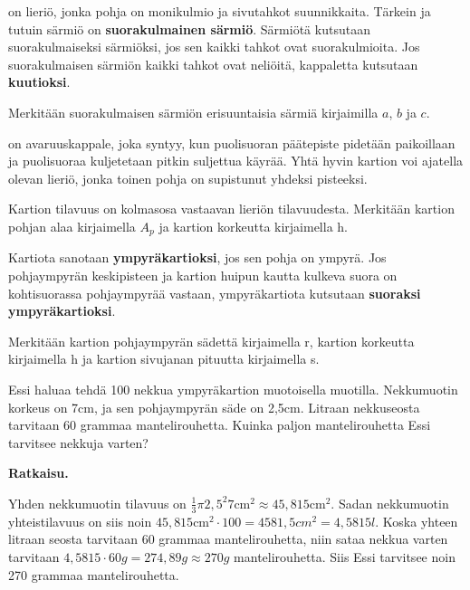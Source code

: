  on lieriö, jonka pohja on monikulmio ja sivutahkot suunnikkaita.
Tärkein ja tutuin särmiö on \textbf{suorakulmainen särmiö}.
Särmiötä kutsutaan suorakulmaiseksi särmiöksi, jos sen kaikki tahkot ovat suorakulmioita. Jos suorakulmaisen särmiön kaikki tahkot ovat neliöitä, kappaletta kutsutaan \textbf{kuutioksi}.

Merkitään suorakulmaisen särmiön erisuuntaisia särmiä kirjaimilla $a$, $b$ ja $c$. 



 on avaruuskappale, joka syntyy, kun puolisuoran päätepiste pidetään paikoillaan ja puolisuoraa kuljetetaan pitkin suljettua käyrää. Yhtä hyvin kartion voi ajatella olevan lieriö, jonka toinen pohja on supistunut yhdeksi pisteeksi.

Kartion tilavuus on kolmasosa vastaavan lieriön tilavuudesta. Merkitään kartion pohjan alaa kirjaimella $A_p$ ja kartion korkeutta kirjaimella h.


Kartiota sanotaan \textbf{ympyräkartioksi}, jos sen pohja on ympyrä. Jos pohjaympyrän keskipisteen ja kartion huipun kautta kulkeva suora on kohtisuorassa pohjaympyrää vastaan, ympyräkartiota kutsutaan \textbf{suoraksi ympyräkartioksi}.

Merkitään kartion pohjaympyrän sädettä kirjaimella r, kartion korkeutta kirjaimella h ja kartion sivujanan pituutta kirjaimella s.



\begin{esimerkki}
Essi haluaa tehdä 100 nekkua ympyräkartion muotoisella muotilla. Nekkumuotin korkeus on 7cm, ja sen pohjaympyrän säde on 2,5cm. Litraan nekkuseosta tarvitaan 60 grammaa mantelirouhetta. Kuinka paljon mantelirouhetta Essi tarvitsee nekkuja varten?

\textbf{Ratkaisu.}

Yhden nekkumuotin tilavuus on $\frac{1}{3} \pi 2,5^2 7 \text{cm}^2 \approx 45,815\text{cm}^2.$ Sadan nekkumuotin yhteistilavuus on siis noin $45,815\text{cm}^2 \cdot 100 = 4581,5 {cm}^2=4,5815 l$. Koska yhteen litraan seosta tarvitaan 60 grammaa mantelirouhetta, niin sataa nekkua varten tarvitaan $4,5815 \cdot 60 g = 274,89g \approx 270 g$ mantelirouhetta. Siis Essi tarvitsee noin 270 grammaa mantelirouhetta.

\end{esimerkki}

